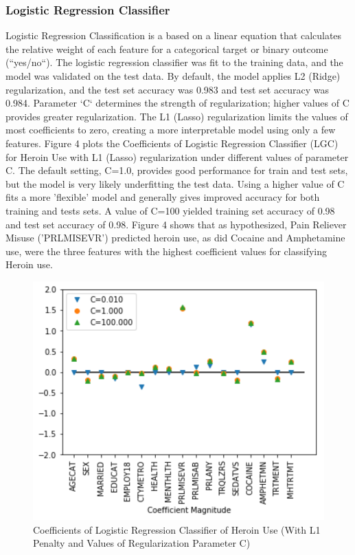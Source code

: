 \documentclass[sigconf]{acmart}
\begin{document}
\subsubsection{Logistic Regression Classifier}

Logistic Regression Classification is a based on a linear equation that 
calculates the relative weight of each feature for a categorical target or 
binary outcome (``yes/no``). The logistic regression classifier was fit to 
the training data, and the model was validated on the test data. By default, 
the model applies L2 (Ridge) regularization, and the test set accuracy 
was 0.983 and test set accuracy was 0.984. Parameter `C` determines the 
strength of regularization; higher values of C provides greater regularization. 
The L1 (Lasso) regularization limits the values of most coefficients to zero, 
creating a more interpretable model using only a few features. Figure 4 plots 
the Coefficients of Logistic Regression Classifier (LGC) for Heroin Use with 
L1 (Lasso) regularization under different values of parameter C. The default 
setting, C=1.0, provides good performance for train and test sets, but the 
model is very likely underfitting the test data. Using a higher value of C 
fits a more 'flexible' model and generally gives improved accuracy for both 
training and tests sets. A value of C=100 yielded training set accuracy of
0.98 and test set accuracy of 0.98. Figure 4 shows that as hypothesized,
Pain Reliever Misuse ('PRLMISEVR') predicted heroin use, as did Cocaine and 
Amphetamine use, were the three features with the highest coefficient values 
for classifying Heroin use. 

\begin{figure}[!ht]
  \centering\includegraphics[width=\columnwidth]{images/Figure4.pdf}
  \caption{Coefficients of Logistic Regression Classifier of Heroin Use 
  (With L1 Penalty and Values of Regularization Parameter C)}
  \label{f:Figure4}
\end{figure}
\end{document}
